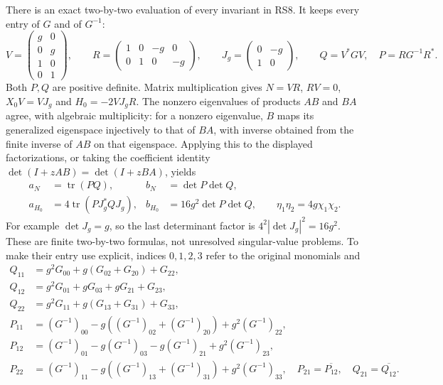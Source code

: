 \documentclass[11pt]{article}
\newcommand{\tr}{\operatorname{tr}}
\begin{document}
There is an exact two-by-two evaluation of every invariant in RS8.
It keeps every entry of $G$ and of $G^{-1}$:
\begin{equation}
 V=\begin{pmatrix}g&0\\0&g\\1&0\\0&1\end{pmatrix},\qquad
 R=\begin{pmatrix}1&0&-g&0\\0&1&0&-g\end{pmatrix},\qquad
 J_g=\begin{pmatrix}0&-g\\1&0\end{pmatrix},\qquad
 Q=V^*GV,\quad P=RG^{-1}R^*.
 \tag{RS9}
\end{equation}
Both $P,Q$ are positive definite. Matrix multiplication gives
$N=VR$, $RV=0$, $X_0V=VJ_g$ and $H_0=-2VJ_gR$.
The nonzero eigenvalues of products $AB$ and $BA$ agree, with
algebraic multiplicity: for a nonzero eigenvalue, $B$ maps its
generalized eigenspace injectively to that of $BA$, with inverse
obtained from the finite inverse of $AB$ on that eigenspace.
Applying this to the displayed factorizations, or taking the
coefficient identity $\det(I+zAB)=\det(I+zBA)$, yields
\begin{equation}
 \begin{aligned}
 a_N&=\tr(PQ),& b_N&=\det P\det Q,\\
 a_{H_0}&=4\tr(PJ_g^*QJ_g),&
 b_{H_0}&=16g^2\det P\det Q,\qquad
 \eta_1\eta_2=4g\chi_1\chi_2.
 \end{aligned}
 \tag{RS10}
\end{equation}
For example $\det J_g=g$, so the last determinant factor is
$4^2|\det J_g|^2=16g^2$. These are finite two-by-two formulas,
not unresolved singular-value problems. To make their entry use
explicit, indices $0,1,2,3$ refer to the original monomials and
\begin{equation}
 \begin{aligned}
 Q_{11}&=g^2G_{00}+g(G_{02}+G_{20})+G_{22},\\
 Q_{12}&=g^2G_{01}+gG_{03}+gG_{21}+G_{23},\\
 Q_{22}&=g^2G_{11}+g(G_{13}+G_{31})+G_{33},\\
 P_{11}&=(G^{-1})_{00}-g((G^{-1})_{02}+(G^{-1})_{20})
                                      +g^2(G^{-1})_{22},\\
 P_{12}&=(G^{-1})_{01}-g(G^{-1})_{03}-g(G^{-1})_{21}
                                      +g^2(G^{-1})_{23},\\
 P_{22}&=(G^{-1})_{11}-g((G^{-1})_{13}+(G^{-1})_{31})
                                      +g^2(G^{-1})_{33},
 \quad P_{21}=\overline{P_{12}},\quad Q_{21}=\overline{Q_{12}}.
 \end{aligned}
 \tag{RS11}
\end{equation}
\end{document}
